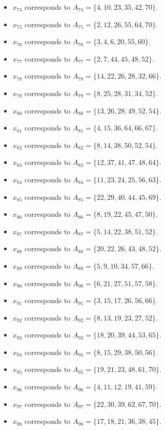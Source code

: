 \documentclass[11pt]{article}
\begin{document}
\begin{itemize}
\item $x_{74}$ corresponds to $A_{74}=\{4, 10, 23, 35, 42, 70\}$.
\item $x_{75}$ corresponds to $A_{75}=\{2, 12, 26, 55, 64, 70\}$.
\item $x_{76}$ corresponds to $A_{76}=\{3, 4, 6, 20, 55, 60\}$.
\item $x_{77}$ corresponds to $A_{77}=\{2, 7, 44, 45, 48, 52\}$.
\item $x_{78}$ corresponds to $A_{78}=\{14, 22, 26, 28, 32, 66\}$.
\item $x_{79}$ corresponds to $A_{79}=\{8, 25, 28, 31, 34, 52\}$.
\item $x_{80}$ corresponds to $A_{80}=\{13, 26, 28, 49, 52, 54\}$.
\item $x_{81}$ corresponds to $A_{81}=\{4, 15, 36, 64, 66, 67\}$.
\item $x_{82}$ corresponds to $A_{82}=\{8, 14, 38, 50, 52, 54\}$.
\item $x_{83}$ corresponds to $A_{83}=\{12, 37, 41, 47, 48, 64\}$.
\item $x_{84}$ corresponds to $A_{84}=\{11, 23, 24, 25, 56, 63\}$.
\item $x_{85}$ corresponds to $A_{85}=\{22, 29, 40, 44, 45, 69\}$.
\item $x_{86}$ corresponds to $A_{86}=\{8, 19, 22, 45, 47, 50\}$.
\item $x_{87}$ corresponds to $A_{87}=\{5, 14, 22, 38, 51, 52\}$.
\item $x_{88}$ corresponds to $A_{88}=\{20, 22, 26, 43, 48, 52\}$.
\item $x_{89}$ corresponds to $A_{89}=\{5, 9, 10, 34, 57, 66\}$.
\item $x_{90}$ corresponds to $A_{90}=\{6, 21, 27, 51, 57, 58\}$.
\item $x_{91}$ corresponds to $A_{91}=\{3, 15, 17, 26, 56, 66\}$.
\item $x_{92}$ corresponds to $A_{92}=\{8, 13, 19, 23, 27, 52\}$.
\item $x_{93}$ corresponds to $A_{93}=\{18, 20, 39, 44, 53, 65\}$.
\item $x_{94}$ corresponds to $A_{94}=\{8, 15, 29, 38, 50, 56\}$.
\item $x_{95}$ corresponds to $A_{95}=\{19, 21, 23, 48, 61, 70\}$.
\item $x_{96}$ corresponds to $A_{96}=\{4, 11, 12, 19, 41, 59\}$.
\item $x_{97}$ corresponds to $A_{97}=\{22, 30, 39, 62, 67, 70\}$.
\item $x_{98}$ corresponds to $A_{98}=\{17, 18, 21, 36, 38, 45\}$.

\end{itemize}
\end{document}
